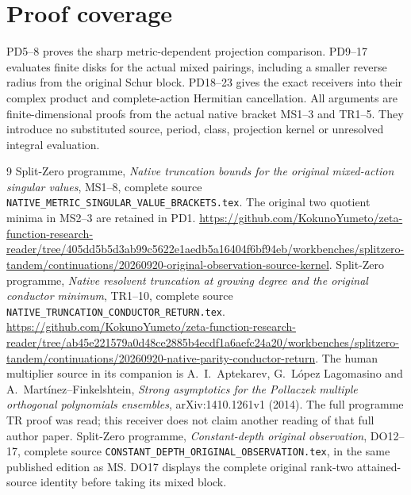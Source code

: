 \documentclass[11pt]{article}
\begin{document}
\section{Proof coverage}
PD5--8 proves the sharp metric-dependent projection comparison.
PD9--17 evaluates finite disks for the actual mixed pairings,
including a smaller reverse radius from the original Schur block.
PD18--23 gives the exact receivers into their complex product and
complete-action Hermitian cancellation.  All arguments are
finite-dimensional proofs from the actual native bracket MS1--3
and TR1--5.  They introduce no substituted source, period, class,
projection kernel or unresolved integral evaluation.
\begin{thebibliography}{9}
 Split-Zero programme,
\emph{Native truncation bounds for the original mixed-action singular values},
MS1--8, complete source \texttt{NATIVE\_METRIC\_SINGULAR\_VALUE\_BRACKETS.tex}.
The original two quotient minima in MS2--3 are retained in PD1.
\url{https://github.com/KokunoYumeto/zeta-function-research-reader/tree/405dd5b5d3ab99c5622e1aedb5a16404f6bf94eb/workbenches/splitzero-tandem/continuations/20260920-original-observation-source-kernel}.
 Split-Zero programme,
\emph{Native resolvent truncation at growing degree and the original conductor minimum},
TR1--10, complete source \texttt{NATIVE\_TRUNCATION\_CONDUCTOR\_RETURN.tex}.
\url{https://github.com/KokunoYumeto/zeta-function-research-reader/tree/ab45e221579a0d48ce2885b4ecdf1a6aefc24a20/workbenches/splitzero-tandem/continuations/20260920-native-parity-conductor-return}.
The human multiplier source in its companion is A.~I.~Aptekarev,
G.~L\'opez Lagomasino and A.~Mart\'inez--Finkelshtein,
\emph{Strong asymptotics for the Pollaczek multiple orthogonal polynomials ensembles},
arXiv:1410.1261v1 (2014). The full programme TR proof was read;
this receiver does not claim another reading of that full author paper.
 Split-Zero programme,
\emph{Constant-depth original observation},
DO12--17, complete source \texttt{CONSTANT\_DEPTH\_ORIGINAL\_OBSERVATION.tex},
in the same published edition as MS. DO17 displays the complete original
rank-two attained-source identity before taking its mixed block.
\end{thebibliography}
\end{document}
